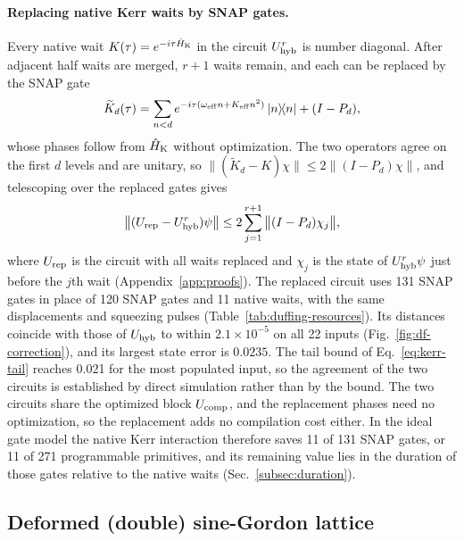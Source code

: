 \documentclass[pra,twocolumn,superscriptaddress,nofootinbib,floatfix]{revtex4-2}
\theoremstyle{remark}
\newcommand{\revcolor}{\color{blue}}
\DeclareRobustCommand{\rev}[1]{{\revcolor #1}}
\begin{document}
\paragraph{\rev{Replacing native Kerr waits by SNAP gates.}}
\rev{Every native wait \(K(\tau)=e^{-i\tau\hat H_{\rm K}}\) in the circuit \(U_{\rm hyb}^r\) is number diagonal.} \rev{After adjacent half waits are merged, \(r+1\) waits remain, and each can be replaced by the SNAP gate}
\begingroup\revcolor
\begin{align}
\widetilde K_d(\tau)=\sum_{n<d}e^{-i\tau(\omega_{\rm eff}n+K_{\rm eff}n^2)}\ketbra{n}{n}+(I-P_d),
\label{eq:kerr-snap}
\end{align}
\endgroup
\rev{whose phases follow from \(\hat H_{\rm K}\) without optimization.} \rev{The two operators agree on the first \(d\) levels and are unitary, so \(\|(\widetilde K_d-K)\chi\|\le2\|(I-P_d)\chi\|\), and telescoping over the replaced gates gives}
\begingroup\revcolor
\begin{align}
\big\|(U_{\rm rep}-U_{\rm hyb}^r)\psi\big\|\le2\sum_{j=1}^{r+1}\big\|(I-P_d)\chi_j\big\| ,
\label{eq:kerr-tail}
\end{align}
\endgroup
\rev{where \(U_{\rm rep}\) is the circuit with all waits replaced and \(\chi_j\) is the state of \(U_{\rm hyb}^r\psi\) just before the \(j\)th wait (Appendix~\ref{app:proofs}).} \rev{The replaced circuit uses 131 SNAP gates in place of 120 SNAP gates and 11 native waits, with the same displacements and squeezing pulses (Table~\ref{tab:duffing-resources}).} \rev{Its distances coincide with those of \(U_{\rm hyb}\) to within \(2.1\times10^{-5}\) on all 22 inputs (Fig.~\ref{fig:df-correction}), and its largest state error is \(0.0235\).} \rev{The tail bound of Eq.~\eqref{eq:kerr-tail} reaches 0.021 for the most populated input, so the agreement of the two circuits is established by direct simulation rather than by the bound.} \rev{The two circuits share the optimized block \(U_{\rm comp}\), and the replacement phases need no optimization, so the replacement adds no compilation cost either.} \rev{In the ideal gate model the native Kerr interaction therefore saves 11 of 131 SNAP gates, or 11 of 271 programmable primitives, and its remaining value lies in the duration of those gates relative to the native waits (Sec.~\ref{subsec:duration}).}


\subsection{\rev{Deformed (double) sine-Gordon lattice}}
\label{sec:dsg}
\end{document}

